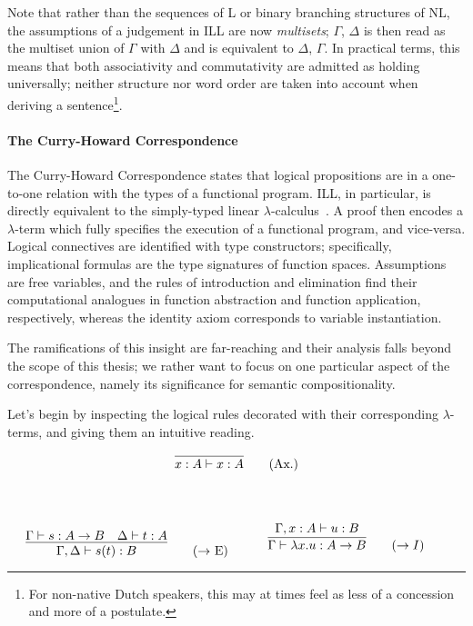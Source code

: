 Note that rather than the sequences of L or binary branching structures of NL, the assumptions of a judgement in ILL are now \textit{multisets}; $\Gamma$, $\Delta$ is then read as the multiset union of $\Gamma$ with $\Delta$ and is equivalent to $\Delta$, $\Gamma$.
In practical terms, this means that both associativity and commutativity are admitted as holding universally; neither structure nor word order are taken into account when deriving a sentence\footnote{For non-native Dutch speakers, this may at times feel as less of a concession and more of a postulate.}.

\paragraph{The Curry-Howard Correspondence}
The Curry-Howard Correspondence states that logical propositions are in a one-to-one relation with the types of a functional program.
ILL, in particular, is directly equivalent to the simply-typed linear $\lambda$-calculus~\cite{benton1993term}.
A proof then encodes a $\lambda$-term which fully specifies the execution of a functional program, and vice-versa.
Logical connectives are identified with type constructors; specifically, implicational formulas are the type signatures of function spaces. 
Assumptions are free variables, and the rules of introduction and elimination find their computational analogues in function abstraction and function application, respectively, whereas the identity axiom corresponds to variable instantiation.

The ramifications of this insight are far-reaching and their analysis falls beyond the scope of this thesis; we rather want to focus on one particular aspect of the correspondence, namely its significance for semantic compositionality.

Let's begin by inspecting the logical rules decorated with their corresponding $\lambda$-terms, and giving them an intuitive reading.

\begin{center}
\begin{minipage}{0.5\textwidth}
\[
\infer{x: A \vdash x: A}{}\tag{Ax.}
\]
\end{minipage}\\
\end{center}
\begin{align*}
    \begin{minipage}{0.5\textwidth}
	\[
        \infer{\Gamma, \Delta \vdash s(t): B}{
            \Gamma \vdash s: A \rightarrow B
            &
            \Delta \vdash t: A
        }\tag{$\rightarrow$ E}
    \]
    \end{minipage}
    \begin{minipage}{0.5\textwidth}
    \[
        \infer{\Gamma \vdash \lambda x. u : A \rightarrow B}{
            \Gamma, x: A \vdash u: B
        }\tag{$\rightarrow I$}\\
    \]
    \end{minipage}
\end{align*}

